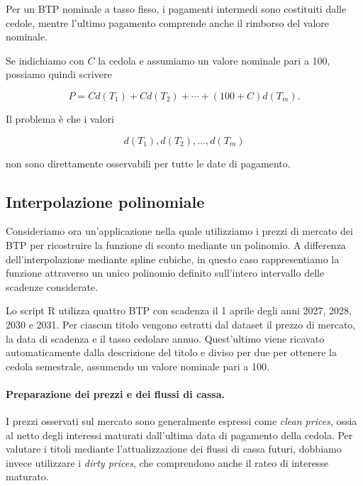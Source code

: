 Per un BTP nominale a tasso fisso, i pagamenti intermedi sono
costituiti dalle cedole, mentre l'ultimo pagamento comprende anche
il rimborso del valore nominale.

Se indichiamo con $C$ la cedola e assumiamo un valore nominale pari
a 100, possiamo quindi scrivere

\begin{equation*}
    P
    =
    Cd(T_1)
    +Cd(T_2)
    +\cdots+
    (100+C)d(T_m).
    \label{eq:btp-pricing-fixed}
\end{equation*}

Il problema è che i valori

\begin{equation*}
    d(T_1),d(T_2),\ldots,d(T_m)
\end{equation*}

non sono direttamente osservabili per tutte le date di pagamento.


\subsection{Interpolazione polinomiale}

Consideriamo ora un'applicazione nella quale utilizziamo i prezzi di mercato dei BTP per ricostruire la funzione di sconto mediante un polinomio. A differenza dell'interpolazione mediante spline cubiche, in questo caso rappresentiamo la funzione attraverso un unico polinomio definito sull'intero intervallo delle scadenze considerate.

Lo script R utilizza quattro BTP con scadenza il 1\textdegree{} aprile degli anni 2027, 2028, 2030 e 2031. Per ciascun titolo vengono estratti dal dataset il prezzo di mercato, la data di scadenza e il tasso cedolare annuo. Quest'ultimo viene ricavato automaticamente dalla descrizione del titolo e diviso per due per ottenere la cedola semestrale, assumendo un valore nominale pari a 100.

\paragraph{Preparazione dei prezzi e dei flussi di cassa.}
I prezzi osservati sul mercato sono generalmente espressi come \emph{clean prices}, ossia al netto degli interessi maturati dall'ultima data di pagamento della cedola. Per valutare i titoli mediante l'attualizzazione dei flussi di cassa futuri, dobbiamo invece utilizzare i \emph{dirty prices}, che comprendono anche il rateo di interesse maturato.

